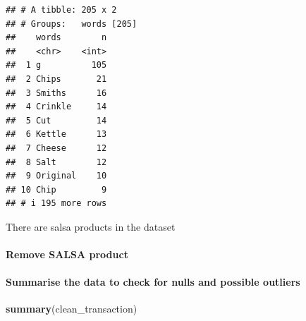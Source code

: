 \documentclass[
]{article}
\newenvironment{Shaded}{\begin{snugshade}}{\end{snugshade}}
\newcommand{\AttributeTok}[1]{\textcolor[rgb]{0.13,0.29,0.53}{#1}}
\newcommand{\DocumentationTok}[1]{\textcolor[rgb]{0.56,0.35,0.01}{\textbf{\textit{#1}}}}
\newcommand{\FunctionTok}[1]{\textcolor[rgb]{0.13,0.29,0.53}{\textbf{#1}}}
\newcommand{\NormalTok}[1]{#1}
\newcommand{\OtherTok}[1]{\textcolor[rgb]{0.56,0.35,0.01}{#1}}
\newcommand{\SpecialCharTok}[1]{\textcolor[rgb]{0.81,0.36,0.00}{\textbf{#1}}}
\newcommand{\StringTok}[1]{\textcolor[rgb]{0.31,0.60,0.02}{#1}}
\begin{document}
\begin{verbatim}
## # A tibble: 205 x 2
## # Groups:   words [205]
##    words        n
##    <chr>    <int>
##  1 g          105
##  2 Chips       21
##  3 Smiths      16
##  4 Crinkle     14
##  5 Cut         14
##  6 Kettle      13
##  7 Cheese      12
##  8 Salt        12
##  9 Original    10
## 10 Chip         9
## # i 195 more rows
\end{verbatim}

There are salsa products in the dataset

\hypertarget{remove-salsa-product}{%
\paragraph{Remove SALSA product}\label{remove-salsa-product}}

\begin{Shaded}
\end{Shaded}

\hypertarget{summarise-the-data-to-check-for-nulls-and-possible-outliers}{%
\paragraph{Summarise the data to check for nulls and possible
outliers}\label{summarise-the-data-to-check-for-nulls-and-possible-outliers}}

\begin{Shaded}
\begin{Highlighting}[]
\FunctionTok{summary}\NormalTok{(clean\_transaction)}
\end{Highlighting}
\end{Shaded}
\end{document}
